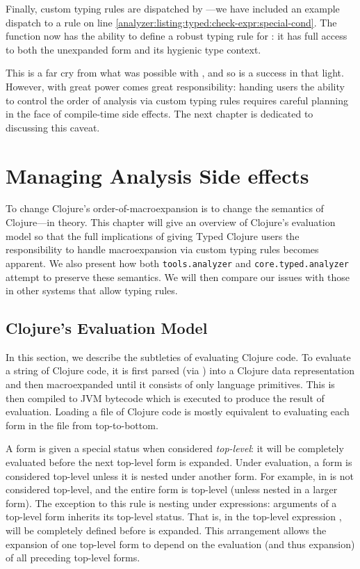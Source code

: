 Finally, custom typing rules are dispatched by ---we have included
an example dispatch to a  rule on line \ref{analyzer:listing:typed:check-expr:special-cond}.
The  function now has the ability
to define a robust typing rule for : it has full access to both
the unexpanded  form and its hygienic type context.

This is a far cry from what was possible with ,
and so  is a success in that light.
However, with great power comes great responsibility:
handing users
the ability to control the order of analysis
via custom typing rules
requires careful planning in the face of compile-time side effects.
The next chapter is dedicated to discussing this caveat.

\chapter{Managing Analysis Side effects}

To change Clojure's order-of-macroexpansion is to change the semantics
of Clojure---in theory.
This chapter will give an overview of Clojure's evaluation model
so that the full implications of giving Typed Clojure users the responsibility
to handle macroexpansion via custom typing rules becomes apparent.
We also present how both \texttt{tools.analyzer} and \texttt{core.typed.analyzer}
attempt to preserve these semantics.
We will then compare our issues with those in other systems that allow
typing rules.

\section{Clojure's Evaluation Model}

In this section, we describe the subtleties of evaluating Clojure code.
To evaluate a string of Clojure code, it is first parsed (via ) into
a Clojure data representation and then macroexpanded until
it consists of only language primitives.
This is then compiled to JVM bytecode which is executed
to produce the result of evaluation.
Loading a file of Clojure code is mostly equivalent to
evaluating each form in the file from top-to-bottom.

A form is given a special status when considered
\emph{top-level}: it will be completely evaluated
before the next top-level form is expanded.
Under evaluation, a form is considered top-level 
unless it is nested under another form.
For example,  in 
is not considered top-level, and the entire  form
is top-level (unless nested in a larger form).
The exception to this rule is nesting under
 expressions:
arguments of a top-level  form inherits its top-level status.
That is, in the top-level expression ,
 will be completely defined before
 is expanded.
This arrangement allows the expansion of one top-level form
to depend on the evaluation (and thus expansion) of all preceding top-level forms.

